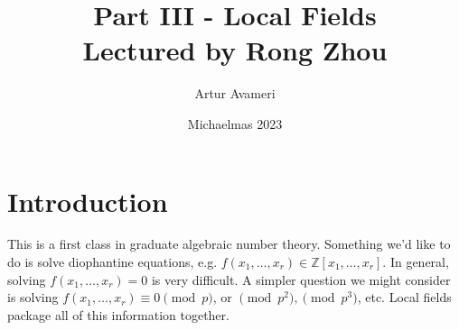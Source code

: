 \documentclass{article}
\title{Part III - Local Fields
    \\ \large
    Lectured by Rong Zhou 
}
\author{Artur Avameri}
\date{Michaelmas 2023}
\theoremstyle{definition}
\begin{document}
\maketitle
\tableofcontents
\newpage
 
\section{Introduction}

This is a first class in graduate algebraic number theory. Something we'd like to do is solve diophantine equations, e.g. $f(x_1,\ldots,x_r) \in \mathbb{Z}[x_1,\ldots,x_r]$. In general, solving $f(x_1,\ldots,x_r) = 0$ is very difficult. A simpler question we might consider is solving $f(x_1,\ldots,x_r) \equiv 0 \pmod{p}$, or $\pmod{p^2}, \pmod{p^3}$, etc. Local fields package all of this information together. 
\end{document}
